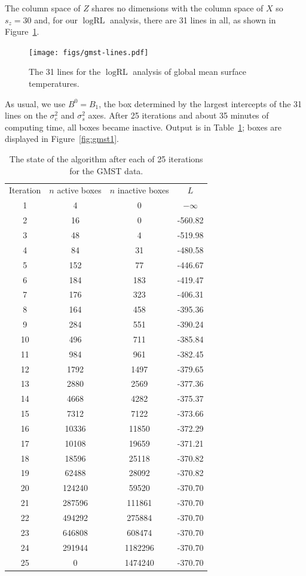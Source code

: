 \documentclass{report}
\newcommand{\textcompute}{\textsf}
\newcommand{\RLorig}{\text{RL}}
\newcommand{\logRLorig}{\log\RLorig}
\newcommand{\sigssq}{\sigma_s^2}
\newcommand{\sigesq}{\sigma_e^2}
\newcommand{\maxit}{\textcompute{maxit}}
\begin{document}
The column space of $Z$ shares no dimensions with the column space of $X$ so $s_z=30$ and, for our $\logRLorig$ analysis, there are 31 lines in all, as shown in Figure~\ref{fig:gmst-lines}.
\begin{figure}
	\centering
	\texttt{[image: figs/gmst-lines.pdf]}
	\caption{The 31 lines for the $\logRLorig$ analysis of
	              global mean surface temperatures.}
	\label{fig:gmst-lines}
\end{figure}
As usual, we use $B^0 = B_1$, the box determined by the largest intercepts of the 31 lines on the $\sigesq$ and $\sigssq$ axes.
After 25 iterations and about 35 minutes of computing time, all boxes became inactive.  Output is in Table~\ref{table:gmst_output}; boxes are displayed in Figure~\ref{fig:gmst1}.
\begin{table}%
\centering
\begin{tabular}{|c|c|c|c|}
\hline
Iteration & $n$ active boxes & $n$ inactive boxes & $L$\\
1 & 4 & 0 & $-\infty$\\
2 & 16 & 0 & -560.82\\
3 & 48 & 4 & -519.98\\
4 & 84 & 31 & -480.58\\
5 & 152 & 77 & -446.67\\
6 & 184 & 183 & -419.47\\
7 & 176 & 323 & -406.31\\
8 & 164 & 458 & -395.36\\
9 & 284 & 551 & -390.24\\
10 & 496 & 711 & -385.84\\
11 & 984 & 961 & -382.45\\
12 & 1792 & 1497 & -379.65\\
13 & 2880 & 2569 & -377.36\\
14 & 4668 & 4282 & -375.37\\
15 & 7312 & 7122 & -373.66\\
16 & 10336 & 11850 & -372.29\\
17 & 10108 & 19659 & -371.21\\
18 & 18596 & 25118 & -370.82\\
19 & 62488 & 28092 & -370.82\\
20 & 124240 & 59520 & -370.70\\
21 & 287596 & 111861 & -370.70\\
22 & 494292 & 275884 & -370.70\\
23 & 646808 & 608474 & -370.70\\
24 & 291944 & 1182296 & -370.70\\
25 & 0 & 1474240 & -370.70\\
\hline
\end{tabular}
\caption{The state of the algorithm after each of 25 iterations for the GMST data.}
\label{table:gmst_output}
\end{table}
\end{document}
